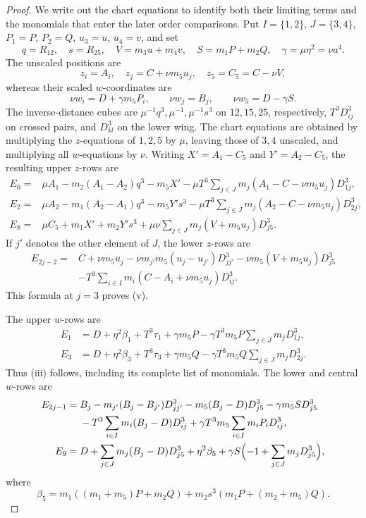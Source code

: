 \documentclass[11pt]{amsart}
\theoremstyle{definition}
\theoremstyle{remark}
\begin{document}
{\begin{proof}
We write out the chart equations to identify both their limiting terms and the
monomials that enter the later order comparisons.
Put $I=\{1,2\}$, $J=\{3,4\}$, $P_1=P$, $P_2=Q$, $u_3=u$, $u_4=v$,
and set
\[
q=R_{12},\quad s=R_{25},\quad V=m_3u+m_4v,\quad S=m_1P+m_2Q,
\quad \gamma=\mu\eta^2=\nu a^4.
\]
The unscaled positions are
\[
z_i=A_i,\quad z_j=C+\nu m_5u_j,\quad z_5=C_5=C-\nu V,
\]
whereas their scaled $w$-coordinates are
\[
\nu w_i=D+\gamma m_5P_i,\qquad
\nu w_j=B_j,\qquad \nu w_5=D-\gamma S.
\]
The inverse-distance cubes are $\mu^{-1}q^3,\mu^{-1},\mu^{-1}s^3$
on $12,15,25$, respectively, $T^3D_{ij}^3$ on crossed pairs, and
$D_{kl}^3$ on the lower wing.
The chart equations are obtained by multiplying the $z$-equations of $1,2,5$
by $\mu$, leaving those of $3,4$ unscaled, and multiplying all $w$-equations by $\nu$.
Writing $X'=A_1-C_5$ and $Y'=A_2-C_5$, the resulting upper $z$-rows are
\begin{align*}
E_0={}&\mu A_1-m_2(A_1-A_2)q^3-m_5X'
 -\mu T^3\sum_{j\in J}m_j(A_1-C-\nu m_5u_j)D_{1j}^3,\\
E_2={}&\mu A_2-m_1(A_2-A_1)q^3-m_5Y's^3
 -\mu T^3\sum_{j\in J}m_j(A_2-C-\nu m_5u_j)D_{2j}^3,\\
E_8={}&\mu C_5+m_1X'+m_2Y's^3
 +\mu\nu\sum_{j\in J}m_j(V+m_5u_j)D_{j5}^3.
\end{align*}
If $j'$ denotes the other element of $J$, the lower $z$-rows are
\begin{align*}
E_{2j-2}={}&C+\nu m_5u_j
 -\nu m_{j'}m_5(u_j-u_{j'})D_{jj'}^3
 -\nu m_5(V+m_5u_j)D_{j5}^3\\
&-T^3\sum_{i\in I}m_i(C-A_i+\nu m_5u_j)D_{ij}^3.
\end{align*}
This formula at $j=3$ proves (v).

The upper $w$-rows are
\begin{align*}
E_1&=D+\eta^2\beta_1+T^3\tau_1
 +\gamma m_5P-\gamma T^3m_5P\sum_{j\in J}m_jD_{1j}^3,\\
E_3&=D+\eta^2\beta_3+T^3\tau_3
 +\gamma m_5Q-\gamma T^3m_5Q\sum_{j\in J}m_jD_{2j}^3.
\end{align*}
Thus (iii) follows, including its complete list of monomials.
The lower and central $w$-rows are
\begin{align*}
E_{2j-1}={}&B_j-m_{j'}(B_j-B_{j'})D_{jj'}^3-m_5(B_j-D)D_{j5}^3
 -\gamma m_5 S D_{j5}^3\\
&-T^3\sum_{i\in I}m_i(B_j-D)D_{ij}^3
 +\gamma T^3m_5\sum_{i\in I}m_iP_iD_{ij}^3,\\
E_9={}&D+\sum_{j\in J}m_j(B_j-D)D_{j5}^3
 +\eta^2\beta_5+\gamma S\Bigl(-1+\sum_{j\in J}m_jD_{j5}^3\Bigr),
\end{align*}
where
\[
\beta_5=m_1((m_1+m_5)P+m_2Q)
 +m_2s^3(m_1P+(m_2+m_5)Q).
\]


\end{proof}}
\end{document}

